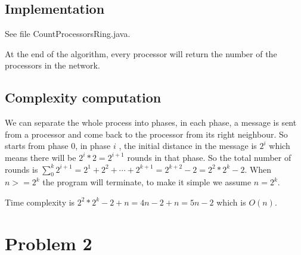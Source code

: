 \documentclass[paper=a4, fontsize=11pt]{scrartcl} %
\numberwithin{equation}{section} %
\numberwithin{figure}{section} %
\numberwithin{table}{section} %
\begin{document}
\subsection*{Implementation}
See file CountProcessorsRing.java.

At the end of the algorithm, every processor will return the number of the processors in the network.
\subsection*{Complexity computation}
We can separate the whole process into phases, in each phase, a message is sent from a processor and come back to the processor from its right neighbour. So starts from phase 0, in phase $i$ , the initial distance in the message is $2^i$ which means there will be $2^{i} * 2 = 2^{i+1}$ rounds in that phase. So the total number of rounds is $\sum_{0}^{k}2^{i+1} = 2^1 + 2^2 + \cdots + 2^{k+1} = 2^{k +2} - 2 = 2^2 * 2^k -2$. When $n >= 2^k$ the program will terminate, to make it simple we assume $n = 2^k$. 

Time complexity is  $2^2 * 2^k -2 + n = 4n - 2 + n = 5n - 2$ which is $O(n)$.



\section*{Problem 2}
\end{document}
